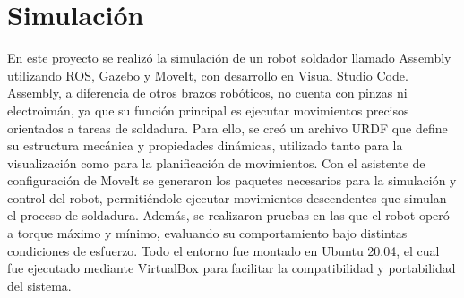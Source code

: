 \section{Simulación} \label{sec:simulacion}
En este proyecto se realizó la simulación de un robot soldador llamado Assembly utilizando ROS, Gazebo y MoveIt, con desarrollo en Visual Studio Code. Assembly, a diferencia de otros brazos robóticos, no cuenta con pinzas ni electroimán, ya que su función principal es ejecutar movimientos precisos orientados a tareas de soldadura. Para ello, se creó un archivo URDF que define su estructura mecánica y propiedades dinámicas, utilizado tanto para la visualización como para la planificación de movimientos. Con el asistente de configuración de MoveIt se generaron los paquetes necesarios para la simulación y control del robot, permitiéndole ejecutar movimientos descendentes que simulan el proceso de soldadura. Además, se realizaron pruebas en las que el robot operó a torque máximo y mínimo, evaluando su comportamiento bajo distintas condiciones de esfuerzo. Todo el entorno fue montado en Ubuntu 20.04, el cual fue ejecutado mediante VirtualBox para facilitar la compatibilidad y portabilidad del sistema.